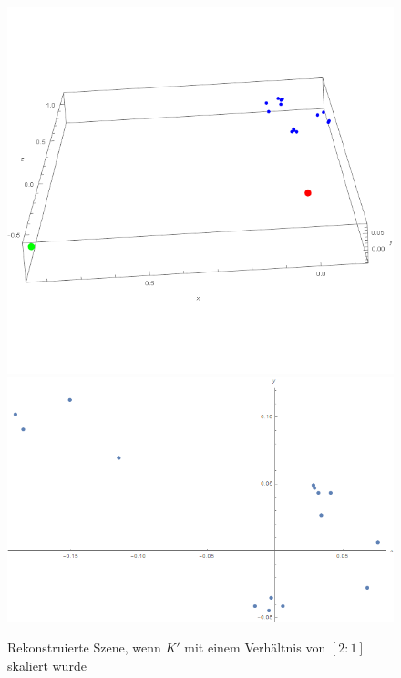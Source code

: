 \begin{figure}[!htb]
	\includegraphics[width=\linewidth]{images/Reconstrution3D_21.png}
	\label{fig:awesome_image1}
	\endminipage\hfill
	\includegraphics[width=\linewidth]{images/Reconstrution2D_21.png}
	\label{fig:awesome_image2}
	\endminipage\hfill
	\caption{Rekonstruierte Szene, wenn $K'$ mit einem Verhältnis von $[2:1]$ skaliert wurde}
\end{figure}
